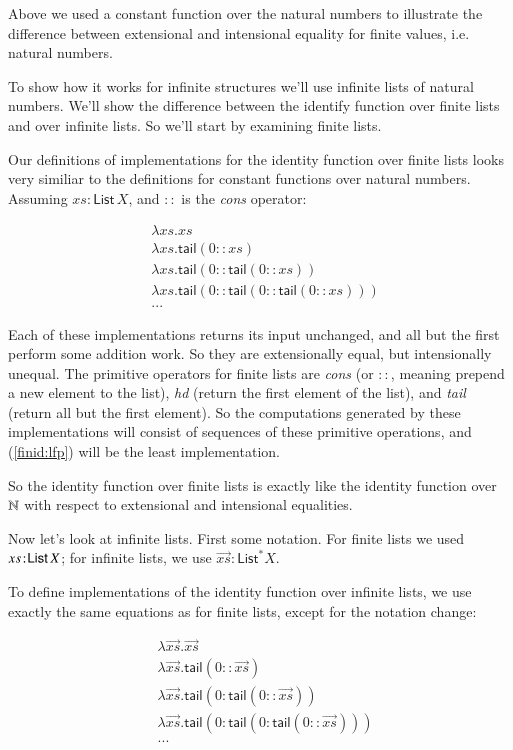 Above we used a constant function over the natural numbers to
illustrate the difference between extensional and intensional
equality for finite values, i.e. natural numbers.

To show how it works for infinite structures we'll use infinite lists
of natural numbers. We'll show the difference between the identify
function over finite lists and over infinite lists. So we'll start by
examining finite lists.

Our definitions of implementations for the identity function over
finite lists looks very similiar to the definitions for constant
functions over natural numbers. Assuming \(xs:\textsf{List}\,X\), and
\(::\) is the \textit{cons} operator:

\begin{align}
  & \lambda xs.xs \label{finid:lfp} \\
  & \lambda xs.\textsf{tail}(0::xs) \\
  & \lambda xs.\textsf{tail}(0::\textsf{tail}(0::xs) \label{finid:1}) \\
  & \lambda xs.\textsf{tail}(0::\textsf{tail}(0::\textsf{tail}(0::xs) \label{finid:2})) \\
  & ... \nonumber
\end{align}

Each of these implementations returns its input unchanged, and all but
the first perform some addition work. So they are extensionally equal,
but intensionally unequal. The primitive operators for finite lists
are \textit{cons} (or \(::\), meaning prepend a new element to the list),
\textit{hd} (return the first element of the list), and \textit{tail}
(return all but the first element). So the computations generated by
these implementations will consist of sequences of these primitive
operations, and (\ref{finid:lfp}) will be the least implementation.

So the identity function over finite lists is exactly like the
identity function over \(\mathbb{N}\) with respect to extensional and
intensional equalities.

Now let's look at infinite lists. First some notation. For finite
lists we used \(xs\hspace{1pt}\mathpunct{:}\hspace{-1pt}\textsf{List}\,X\); for infinite lists, we use
\(\overrightarrow{xs}:\textsf{List}^* X\).

To define implementations of the identity function over infinite
lists, we use exactly the same equations as for finite lists, except
for the notation change:

\begin{align}
  & \lambda \overrightarrow{xs}.\overrightarrow{xs} \label{infinid:lfp} \\
  & \lambda \overrightarrow{xs}.\textsf{tail}(0::\overrightarrow{xs})  \label{infinid:1}\\
  & \lambda \overrightarrow{xs}.\textsf{tail}(0:\textsf{tail}(0::\overrightarrow{xs}))  \label{infinid:2}\\
  & \lambda \overrightarrow{xs}.\textsf{tail}(0:\textsf{tail}(0:\textsf{tail}(0::\overrightarrow{xs}))) \label{infinid:3} \\
  & ... \nonumber
\end{align}

